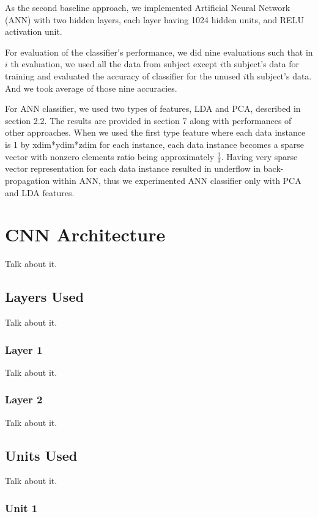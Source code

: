 \documentclass{article} %
\begin{document}
As the second baseline approach, we implemented Artificial Neural Network (ANN) with two hidden layers, each layer having 1024 hidden units, and RELU activation unit. 

For evaluation of the classifier's performance, we did nine evaluations such that in $i$ th evaluation, we used all the data from subject except $i$th subject's data for training and evaluated the accuracy of classifier for the unused $i$th subject's data. And we took average of those nine accuracies. 

For ANN classifier, we used two types of features, LDA and PCA, described in section 2.2. The results are provided in section 7 along with performances of other approaches. When we used the first type feature where each data instance is 1 by xdim*ydim*zdim for each instance, each data instance becomes a sparse vector with nonzero elements ratio being approximately $\frac{1}{3}$. Having very sparse vector representation for each data instance resulted in underflow in back-propagation within ANN, thus we experimented ANN classifier only with PCA and LDA features.  
\section{CNN Architecture}

Talk about it.

\subsection{Layers Used}

Talk about it.

\subsubsection{Layer 1}

Talk about it.

\subsubsection{Layer 2}

Talk about it.

\subsection{Units Used}

Talk about it.

\subsubsection{Unit 1}
\end{document}

